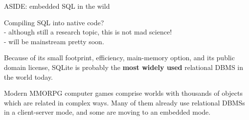 %
%
\begin{frame}{ASIDE: embedded SQL in the wild}

Compiling SQL into native code?\\
 - although still a research topic, this is not mad science!\\
 - will be mainstream pretty soon.

Because of its small footprint, efficiency, main-memory option, and its public domain license, SQLite is probably the \textbf{most widely used} relational DBMS in the world today.

Modern MMORPG computer games comprise worlds with thousands of objects which are related in complex ways. Many of them already use relational DBMSs in a client-server mode, and some are moving to an embedded mode.

\end{frame}


%
%
%
%

%
%

